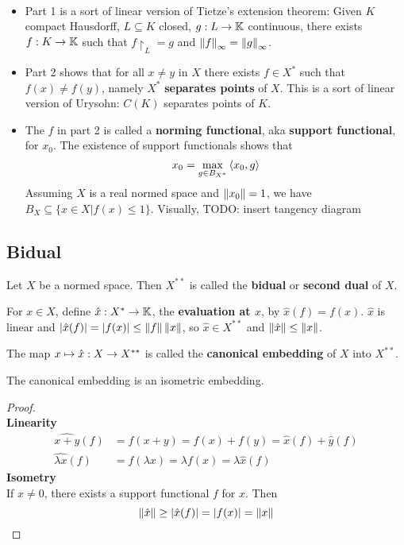 \documentclass{article}
\begin{document}
\begin{rmks}~
  \begin{itemize}
    \item Part 1 is a sort of linear version of Tietze's extension theorem: Given $K$ compact Hausdorff, $L \subseteq K$ closed, $g : L \rightarrow \mathbb K$ continuous, there exists $f : K \rightarrow \mathbb K$ such that $f\restriction_L = g$ and $\left\lVert f\right\rVert_\infty = \left\lVert g\right\rVert_\infty$.
    \item Part 2 shows that for all $x \ne y$ in $X$ there exists $f \in X^*$ such that $f(x) \ne f(y)$, namely $X^*$ {\bf separates points} of $X$. This is a sort of linear version of Urysohn: $C(K)$ separates points of $K$.
    \item The $f$ in part 2 is called a {\bf norming functional}, aka {\bf support functional}, for $x_0$. The existence of support functionals shows that
      $$x_0 = \max_{g \in B_{X^*}} \left\langle x_0, g\right\rangle$$
      Assuming $X$ is a real normed space and $\left\lVert x_0\right\rVert = 1$, we have $B_X \subseteq \{x \in X| f(x) \le 1\}$. Visually, TODO: insert tangency diagram
  \end{itemize}
\end{rmks}

\subsection{Bidual}

Let $X$ be a normed space. Then $X^{**}$ is called the {\bf bidual} or {\bf second dual} of $X$.

For $x \in X$, define $\hat x : X^* \rightarrow \mathbb K$, the {\bf evaluation at $x$}, by $\hat x(f) = f(x)$. $\hat x$ is linear and $|\hat x(f)| = |f(x)| \le \left\lVert f\right\rVert \left\lVert x\right\rVert$, so $\hat x \in X^{**}$ and $\left\lVert \hat x\right\rVert \le \left\lVert x\right\rVert$.

The map $x \mapsto \hat x : X \rightarrow X^{**}$ is called the {\bf canonical embedding} of $X$ into $X^{**}$.

\begin{nthm}\label{thm:can-emb}
  The canonical embedding is an isometric embedding.
\end{nthm}
\begin{proof}~\\
  {\bf Linearity}
  \begin{align*}
    \widehat{x + y}(f) & = f(x + y) = f(x) + f(y) = \hat x(f) + \hat y(f) \\
    \widehat{\lambda x}(f) & = f(\lambda x) = \lambda f(x) = \lambda \hat x(f)
  \end{align*}
  {\bf Isometry} \\
  If $x \ne 0$, there exists a support functional $f$ for $x$. Then
  $$ \left\lVert \hat x\right\rVert \ge |\hat x(f)| = |f(x)| = \left\lVert x\right\rVert$$
\end{proof}
\end{document}
